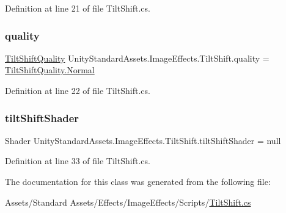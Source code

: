 Definition at line 21 of file Tilt\+Shift.\+cs.

\mbox{\label{class_unity_standard_assets_1_1_image_effects_1_1_tilt_shift_a3336504f4de0dbb94802f0d78eb27bbc}} 
\subsubsection{\texorpdfstring{quality}{quality}}
{\footnotesize\ttfamily \mbox{\hyperlink{class_unity_standard_assets_1_1_image_effects_1_1_tilt_shift_a25a7f26cb8470a26a167c6d381489605}{Tilt\+Shift\+Quality}} Unity\+Standard\+Assets.\+Image\+Effects.\+Tilt\+Shift.\+quality = \mbox{\hyperlink{class_unity_standard_assets_1_1_image_effects_1_1_tilt_shift_a25a7f26cb8470a26a167c6d381489605a960b44c579bc2f6818d2daaf9e4c16f0}{Tilt\+Shift\+Quality.\+Normal}}}



Definition at line 22 of file Tilt\+Shift.\+cs.

\mbox{\label{class_unity_standard_assets_1_1_image_effects_1_1_tilt_shift_ab5f08d9ebd9012a4e26bbf6e711a0cf7}} 
\subsubsection{\texorpdfstring{tilt\+Shift\+Shader}{tiltShiftShader}}
{\footnotesize\ttfamily Shader Unity\+Standard\+Assets.\+Image\+Effects.\+Tilt\+Shift.\+tilt\+Shift\+Shader = null}



Definition at line 33 of file Tilt\+Shift.\+cs.



The documentation for this class was generated from the following file\+:\begin{DoxyCompactItemize}
\item 
Assets/\+Standard Assets/\+Effects/\+Image\+Effects/\+Scripts/\mbox{\hyperlink{_tilt_shift_8cs}{Tilt\+Shift.\+cs}}\end{DoxyCompactItemize}
